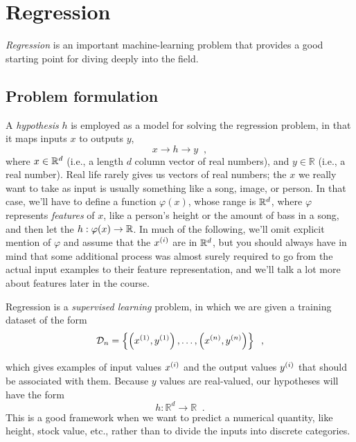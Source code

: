 \chapter{Regression}
\label{chap-regression}

{\em Regression} is an important %
machine-learning problem that provides a good starting point for
diving deeply into the field.

\section{Problem formulation}

A {\em hypothesis} $h$ is employed as a
model for solving the regression problem, in that it maps inputs $x$
to outputs $y$,
$$ x \rightarrow \boxed{h} \rightarrow y \;\;,$$
where $x \in \mathbb{R}^d$ (i.e., a length $d$ column vector of real numbers),
and $y \in \mathbb{R}$ (i.e., a real number).
Real life rarely gives us vectors of real numbers;  the $x$ we really
want to take as input is usually something like a song, image, or person.
In that case, we'll have to define a function $\varphi(x)$, whose
range is $\mathbb{R}^d$, where $\varphi$ represents
  {\em features} of $x$, like a person's height or the amount of bass in
a song, and then let the $h: \varphi(x) \rightarrow \mathbb{R}$.
In much of the following, we'll omit explicit mention of $\varphi$ and
assume that the $x^{(i)}$ are in $\mathbb{R}^d$, but you should always have
in mind that some additional process was almost surely required to go
from the actual input examples to their feature representation, and
we'll talk a lot more about features later in the course.

Regression is a {\em supervised learning} problem, in which we are given a training dataset of the form
$$
  {\cal D}_n = \left\{\left(x^{(1)}, y^{(1)}\right), \dots,
  \left(x^{(n)}, y^{(n)}\right)\right\}\;\;,
$$

which gives examples of input values $x^{(i)}$ and the output values
$y^{(i)}$ that should be associated with them.
Because $y$ values are real-valued, our hypotheses will have the form
$$ h: \mathbb{R}^d \rightarrow \mathbb{R} \;\;.$$
This is a good framework when we want to predict a numerical quantity,
like height, stock value, etc., rather than to divide the inputs into
discrete categories.

